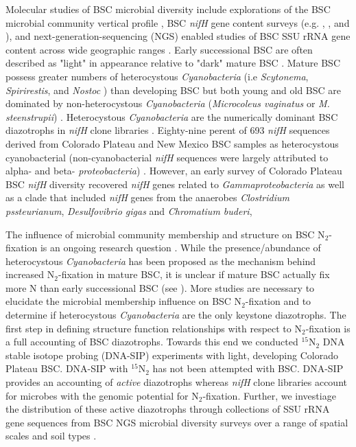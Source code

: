 Molecular studies of BSC microbial diversity include explorations of the BSC
microbial community vertical profile \citep{Garcia_Pichel_2003}, BSC
\textit{nifH} gene content surveys (e.g. \citet{14766579}, \citet{Yeager_2012},
\citet{Yeager} and \citet{Steppe_1996}), and next-generation-sequencing (NGS)
enabled studies of BSC SSU rRNA gene content across wide geographic ranges
\citep{Garcia_Pichel_2013, Steven_2013}. Early successional  BSC are often
described as "light" in appearance relative to "dark" mature BSC
\citep{Belnap_2002, 14766579}. Mature BSC possess greater numbers of
heterocystous \textit{Cyanobacteria} (i.e \textit{Scytonema},
\textit{Spirirestis}, and \textit{Nostoc} \citep{Yeager, Yeager_2012}) than
developing BSC but both young and old BSC are dominated by non-heterocystous
\textit{Cyanobacteria} (\textit{Microcoleus vaginatus} or \textit{M.
steenstrupii}) \citep{14766579, Garcia_Pichel_2013}.  Heterocystous
\textit{Cyanobacteria} are the numerically dominant BSC diazotrophs in
\textit{nifH} clone libraries \citep{Yeager, 14766579, Yeager_2012}.
Eighty-nine perent of 693 \textit{nifH} sequences derived from Colorado Plateau and
New Mexico BSC samples as heterocystous cyanobacterial (non-cyanobacterial
\textit{nifH} sequences were largely attributed to alpha- and beta-
\textit{proteobacteria}) \citet{Yeager}. However, an early survey of Colorado
Plateau BSC \textit{nifH} diversity recovered \textit{nifH} genes related to
\textit{Gammaproteobacteria} as well as a clade that included \textit{nifH}
genes from the anaerobes \textit{Clostridium pssteurianum},
\textit{Desulfovibrio gigas} and \textit{Chromatium buderi},

The influence of microbial community membership and structure on BSC
N$_{2}$-fixation is an ongoing research question \citep{Belnap28062013}. While
the presence/abundance of heterocystous \textit{Cyanobacteria} has been
proposed as the mechanism behind increased N$_{2}$-fixation in mature BSC, it
is unclear if mature BSC actually fix more N than early successional BSC (see
\citet{15643930}). More studies are necessary to elucidate the microbial
membership influence on BSC N$_{2}$-fixation and to determine if heterocystous
\textit{Cyanobacteria} are the only keystone diazotrophs. The first step in
defining structure function relationships with respect to N$_{2}$-fixation is a
full accounting of BSC diazotrophs. Towards this end we conducted
$^{15}$N$_{2}$ DNA stable isotope probing (DNA-SIP) experiments with light,
developing Colorado Plateau BSC.  DNA-SIP with $^{15}$N$_{2}$ has not been
attempted with BSC. DNA-SIP provides an accounting of \textit{active}
diazotrophs whereas \textit{nifH} clone libraries account for microbes with the
genomic potential for N$_{2}$-fixation.  Further, we investiage the
distribution of these active diazotrophs through collections of SSU rRNA
gene sequences from BSC NGS microbial diversity surveys over a range of spatial
scales and soil types \citep{Garcia_Pichel_2013, Steven_2013}. 
